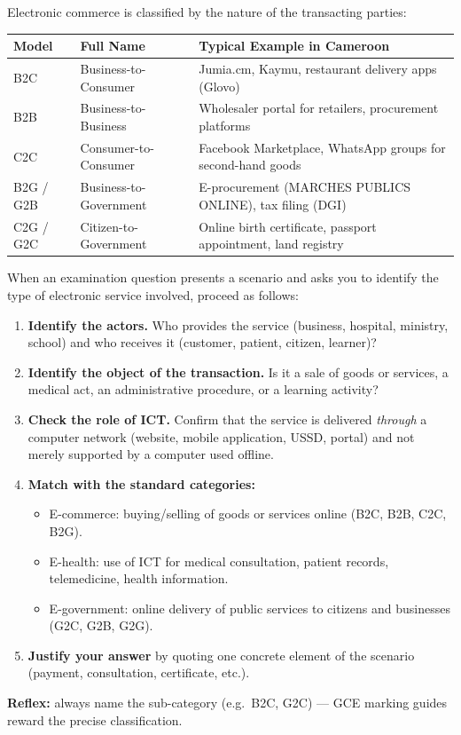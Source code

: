 \documentclass[11pt]{article}
\newcommand{\cle}[1]{{\popxbold\color{popdark}#1}}
\begin{document}
\begin{definition}
Electronic commerce is classified by the nature of the transacting parties:
\begin{center}
\begin{tabularx}{\linewidth}{|l|X|X|}\hline
\rowcolor{popblueL}
\textbf{Model} & \textbf{Full Name} & \textbf{Typical Example in Cameroon} \\ \hline
B2C & Business-to-Consumer & Jumia.cm, Kaymu, restaurant delivery apps (Glovo) \\ \hline
B2B & Business-to-Business & Wholesaler portal for retailers, procurement platforms \\ \hline
C2C & Consumer-to-Consumer & Facebook Marketplace, WhatsApp groups for second-hand goods \\ \hline
B2G / G2B & Business-to-Government & E-procurement (MARCHES PUBLICS ONLINE), tax filing (DGI) \\ \hline
C2G / G2C & Citizen-to-Government & Online birth certificate, passport appointment, land registry \\ \hline
\end{tabularx}
\end{center}
\end{definition}

\begin{methode}
When an examination question presents a scenario and asks you to identify the type of electronic service involved, proceed as follows:
\begin{enumerate}
\item \textbf{Identify the actors.} Who provides the service (business, hospital, ministry, school) and who receives it (customer, patient, citizen, learner)?
\item \textbf{Identify the object of the transaction.} Is it a sale of goods or services, a medical act, an administrative procedure, or a learning activity?
\item \textbf{Check the role of ICT.} Confirm that the service is delivered \emph{through} a computer network (website, mobile application, USSD, portal) and not merely supported by a computer used offline.
\item \textbf{Match with the standard categories:}
\begin{itemize}
\item \cle{E-commerce}: buying/selling of goods or services online (B2C, B2B, C2C, B2G).
\item \cle{E-health}: use of ICT for medical consultation, patient records, telemedicine, health information.
\item \cle{E-government}: online delivery of public services to citizens and businesses (G2C, G2B, G2G).
\end{itemize}
\item \textbf{Justify your answer} by quoting one concrete element of the scenario (payment, consultation, certificate, etc.).
\end{enumerate}
\textbf{Reflex:} always name the sub-category (e.g.\ B2C, G2C) — GCE marking guides reward the precise classification.
\end{methode}
\end{document}
